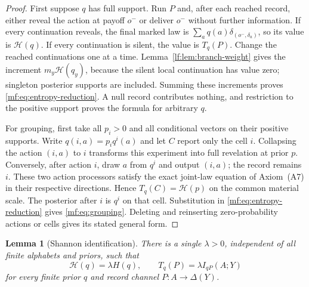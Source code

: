 \documentclass[11pt,a4paper]{article}
\newtheorem{lemma}[theorem]{Lemma}
\theoremstyle{definition}
\newcommand{\D}{\Delta}
\newcommand{\Sh}{H}
\newcommand{\1}{\mathbf 1}
\begin{document}
\begin{proof}
First suppose $q$ has full support.  Run $P$ and, after each reached record,
either reveal the action at payoff $o^-$ or deliver $o^-$ without further
information.  If every continuation reveals, the final marked law is
$\sum_aq(a)\delta_{(o^-,\delta_a)}$, so its value is $\mathcal H(q)$.
If every continuation is silent, the value is $T_q(P)$.  Change the reached
continuations one at a time.  Lemma~\ref{lf:lem:branch-weight} gives the
increment $m_y\mathcal H(q_y)$, because the silent local continuation has
value zero; singleton posterior supports are included.  Summing these
increments proves \eqref{mf:eq:entropy-reduction}.  A null record contributes
nothing, and restriction to the positive support proves the formula for
arbitrary $q$.

For grouping, first take all $p_i>0$ and all conditional vectors on their
positive supports.  Write $q(i,a)=p_iq^i(a)$ and let $C$ report only the cell
$i$.  Collapsing the action $(i,a)$ to $i$ transforms this experiment into
full revelation at prior $p$.  Conversely, after action $i$, draw $a$ from
$q^i$ and output $(i,a)$; the record remains $i$.  These two action processors
satisfy the exact joint-law equation of Axiom~\textup{(A7)} in their respective
directions.  Hence $T_q(C)=\mathcal H(p)$ on the common material scale.
The posterior after $i$ is $q^i$ on that cell.  Substitution in
\eqref{mf:eq:entropy-reduction} gives \eqref{mf:eq:grouping}.  Deleting and
reinserting zero-probability actions or cells gives its stated general form.
\end{proof}

\begin{lemma}[Shannon identification]
\label{mf:lem:entropy-identification}
There is a single $\lambda>0$, independent of all finite alphabets and
priors, such that
\begin{equation}
 \mathcal H(q)=\lambda\Sh(q),
 \qquad
 T_q(P)=\lambda I_{qP}(A;Y)
 \label{mf:eq:trace-MI}
\end{equation}
for every finite prior $q$ and record channel $P:A\to\D(Y)$.
\end{lemma}
\end{document}
